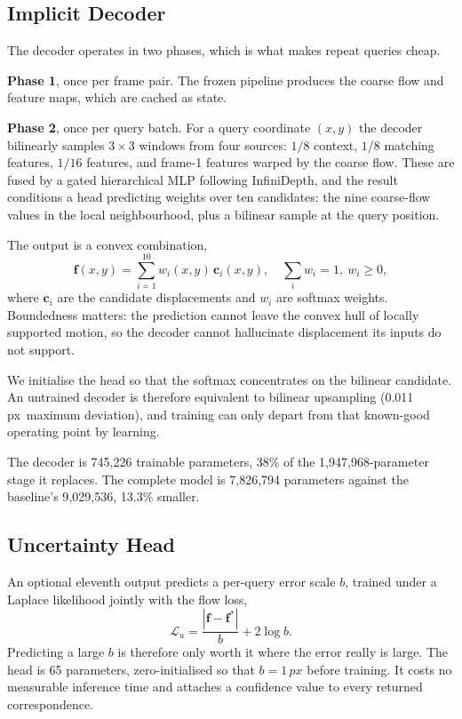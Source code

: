 \documentclass[conference]{IEEEtran}
\newcommand{\px}{\,px}
\begin{document}
\subsection{Implicit Decoder}

The decoder operates in two phases, which is what makes repeat queries cheap.

\textbf{Phase 1}, once per frame pair. The frozen pipeline produces the coarse
flow and feature maps, which are cached as state.

\textbf{Phase 2}, once per query batch. For a query coordinate $(x, y)$ the
decoder bilinearly samples $3{\times}3$ windows from four sources: $1/8$
context, $1/8$ matching features, $1/16$ features, and frame-1 features warped by
the coarse flow. These are fused by a gated hierarchical MLP following
InfiniDepth, and the result conditions a head predicting weights over ten
candidates: the nine coarse-flow values in the local neighbourhood, plus a
bilinear sample at the query position.

The output is a convex combination,
\begin{equation}
\mathbf{f}(x,y) = \sum_{i=1}^{10} w_i(x,y)\, \mathbf{c}_i(x,y),
\quad \sum_i w_i = 1,\ w_i \geq 0,
\end{equation}
where $\mathbf{c}_i$ are the candidate displacements and $w_i$ are softmax
weights. Boundedness matters: the prediction cannot leave the convex hull of
locally supported motion, so the decoder cannot hallucinate displacement its
inputs do not support.

We initialise the head so that the softmax concentrates on the bilinear
candidate. An untrained decoder is therefore equivalent to bilinear upsampling
(0.011\px\ maximum deviation), and training can only depart from that known-good
operating point by learning.

The decoder is 745{,}226 trainable parameters, 38\% of the 1{,}947{,}968-parameter
stage it replaces. The complete model is 7{,}826{,}794 parameters against the
baseline's 9{,}029{,}536, 13.3\% smaller.

\subsection{Uncertainty Head}

An optional eleventh output predicts a per-query error scale $b$, trained under a
Laplace likelihood jointly with the flow loss,
\begin{equation}
\mathcal{L}_u = \frac{|\mathbf{f} - \mathbf{f}^*|}{b} + 2 \log b .
\end{equation}
Predicting a large $b$ is therefore only worth it where the error really is
large. The head is 65 parameters, zero-initialised so that $b = 1\px$ before
training. It costs no measurable inference time and attaches a confidence value
to every returned correspondence.
\end{document}
